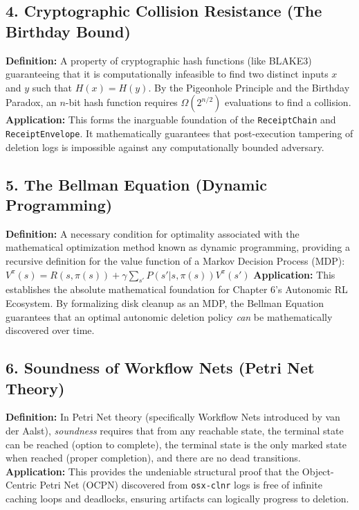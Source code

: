 \documentclass[
  12pt,
]{report}
\begin{document}
\subsection{4. Cryptographic Collision Resistance (The Birthday
Bound)}\label{cryptographic-collision-resistance-the-birthday-bound}

\textbf{Definition:} A property of cryptographic hash functions (like
BLAKE3) guaranteeing that it is computationally infeasible to find two
distinct inputs \(x\) and \(y\) such that \(H(x) = H(y)\). By the
Pigeonhole Principle and the Birthday Paradox, an \(n\)-bit hash
function requires \(\Omega(2^{n/2})\) evaluations to find a collision.
\textbf{Application:} This forms the inarguable foundation of the
\texttt{ReceiptChain} and \texttt{ReceiptEnvelope}. It mathematically
guarantees that post-execution tampering of deletion logs is impossible
against any computationally bounded adversary.

\subsection{5. The Bellman Equation (Dynamic
Programming)}\label{the-bellman-equation-dynamic-programming}

\textbf{Definition:} A necessary condition for optimality associated
with the mathematical optimization method known as dynamic programming,
providing a recursive definition for the value function of a Markov
Decision Process (MDP):
\(V^\pi(s) = R(s, \pi(s)) + \gamma \sum_{s'} P(s' | s, \pi(s)) V^\pi(s')\)
\textbf{Application:} This establishes the absolute mathematical
foundation for Chapter 6's Autonomic RL Ecosystem. By formalizing disk
cleanup as an MDP, the Bellman Equation guarantees that an optimal
autonomic deletion policy \emph{can} be mathematically discovered over
time.

\subsection{6. Soundness of Workflow Nets (Petri Net
Theory)}\label{soundness-of-workflow-nets-petri-net-theory}

\textbf{Definition:} In Petri Net theory (specifically Workflow Nets
introduced by van der Aalst), \emph{soundness} requires that from any
reachable state, the terminal state can be reached (option to complete),
the terminal state is the only marked state when reached (proper
completion), and there are no dead transitions. \textbf{Application:}
This provides the undeniable structural proof that the Object-Centric
Petri Net (OCPN) discovered from \texttt{osx-clnr} logs is free of
infinite caching loops and deadlocks, ensuring artifacts can logically
progress to deletion.
\end{document}
